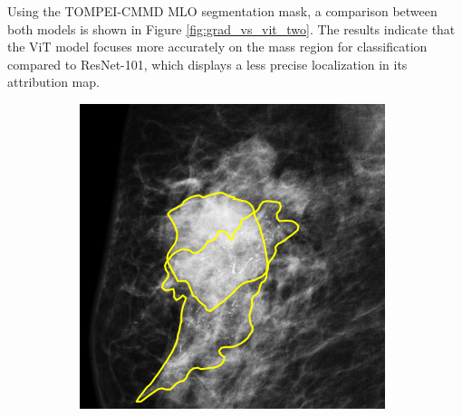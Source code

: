 \documentclass[a4paper,10pt]{book}
\begin{document}
Using the TOMPEI-CMMD\cite{kashiwada_tompei-cmmd_2025} MLO segmentation mask, a comparison between both models is shown in Figure \ref{fig:grad_vs_vit_two}. The results indicate that the ViT model focuses more accurately on the mass region for classification compared to ResNet-101, which displays a less precise localization in its attribution map.



\begin{figure}[h!]
    \centering
    \begin{subfigure}[c]{0.30\textwidth}
        \centering
        \includegraphics[width=\textwidth]{reports//assets/path.png}
        \caption{}
        \label{fig:tompei_patch}
    \end{subfigure}
    \begin{subfigure}[c]{0.30\textwidth}
        \centering

\end{subfigure}
\end{figure}
\end{document}
